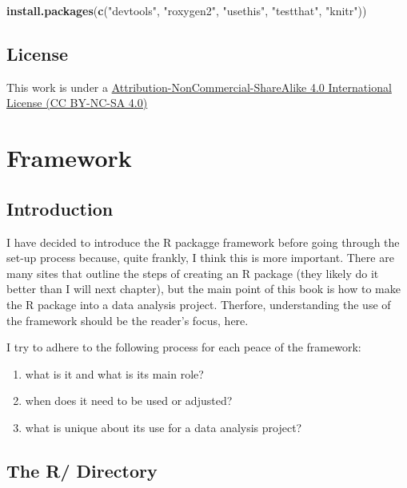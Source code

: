 \documentclass[]{book}
\newenvironment{Shaded}{\begin{snugshade}}{\end{snugshade}}
\newcommand{\KeywordTok}[1]{\textcolor[rgb]{0.13,0.29,0.53}{\textbf{#1}}}
\newcommand{\StringTok}[1]{\textcolor[rgb]{0.31,0.60,0.02}{#1}}
\newcommand{\NormalTok}[1]{#1}
\providecommand{\tightlist}{%
  \setlength{\itemsep}{0pt}\setlength{\parskip}{0pt}}
\begin{document}
\begin{Shaded}
\begin{Highlighting}[]
\KeywordTok{install.packages}\NormalTok{(}\KeywordTok{c}\NormalTok{(}\StringTok{"devtools"}\NormalTok{, }\StringTok{"roxygen2"}\NormalTok{, }\StringTok{"usethis"}\NormalTok{, }\StringTok{"testthat"}\NormalTok{, }\StringTok{"knitr"}\NormalTok{))}
\end{Highlighting}
\end{Shaded}

\section*{License}\label{license}

This work is under a
\href{http://creativecommons.org/licenses/by-nc-sa/4.0/}{Attribution-NonCommercial-ShareAlike
4.0 International License (CC BY-NC-SA 4.0)}

\chapter{Framework}\label{framework}

\section{Introduction}\label{introduction}

I have decided to introduce the R packagge framework before going
through the set-up process because, quite frankly, I think this is more
important. There are many sites that outline the steps of creating an R
package (they likely do it better than I will next chapter), but the
main point of this book is how to make the R package into a data
analysis project. Therfore, understanding the use of the framework
should be the reader's focus, here.

I try to adhere to the following process for each peace of the
framework:

\begin{enumerate}
\def\labelenumi{\arabic{enumi}.}
\tightlist
\item
  what is it and what is its main role?
\item
  when does it need to be used or adjusted?
\item
  what is unique about its use for a data analysis project?
\end{enumerate}

\section{The R/ Directory}\label{the-r-directory}
\end{document}
